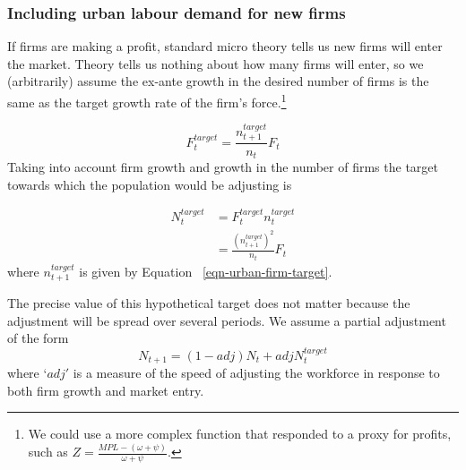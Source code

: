 \subsubsection{Including  urban labour demand for new firms}
If firms are making a profit, standard micro theory tells us new firms will enter the market. %
Theory tells us nothing about how many firms will enter, %
so we (arbitrarily) assume the ex-ante growth in the desired number of firms is the same as the  target growth rate of the firm's  force.\footnote{We could use a more complex function that responded to a proxy for profits, such as $Z=\frac{MPL-(\omega+\psi)}{\omega+\psi}$.} 


 \begin{equation}
F_t^{target}= \frac{n^{target}_{t+1}}{n_{t}}F_t
\end{equation} 
Taking into account firm growth and growth in the number of firms the target towards which the population would be adjusting  is 

 \begin{align}
N_t^{target}&=F_t^{target}n_t^{target}\\
            &= \frac{(n^{target}_{t+1})^2}{n_{t}}F_t
\end{align} 
where $n^{target}_{t+1}$ is given by Equation ~\ref{eqn-urban-firm-target}.  

The precise value of this hypothetical target does not matter because the adjustment will be spread over several periods. We assume a partial adjustment of the form
\begin{equation}
N_{t+1}= (1-adj)N_t + adj N_t^{target}
\end{equation} 
where `$adj'$ is a measure of the speed of adjusting the workforce in response to both firm growth and market entry. %



